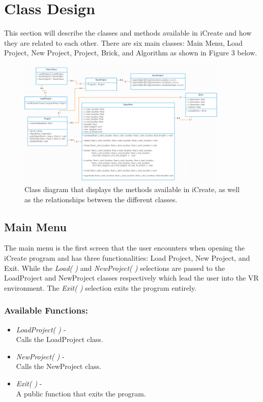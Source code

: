 \documentclass[draftclsnofoot,onecolumn,compsoc]{IEEEtran}
\begin{document}

\section{Class Design}
This section will describe the classes and methods available in iCreate and how they are related to each other. There are six main classes: Main Menu, Load Project, New Project, Project, Brick, and Algorithm as shown in Figure 3 below.
\\
\begin{figure}[H]
  \centering
    \includegraphics[width=0.9\textwidth]{Class_diagram}
    \caption{Class diagram that displays the methods available in iCreate, as well as the relationships between the different classes.}
\end{figure}

\newpage

\subsection{Main Menu}
The main menu is the first screen that the user encounters when opening the iCreate program and has three functionalities: Load Project, New Project, and Exit. While the \textit{Load( )} and \textit{NewProject( )} selections are passed to the LoadProject and NewProject classes respectively which lead the user into the VR environment. The \textit{Exit( )} selection exits the program entirely.

\subsubsection{Available Functions:}
\begin{itemize}
\item \textit{LoadProject( )} -\\
Calls the LoadProject class.
\item \textit{NewProject( )} -\\
Calls the NewProject class.
\item \textit{Exit( )} -\\
A public function that exits the program.
\end{itemize}
\end{document}
